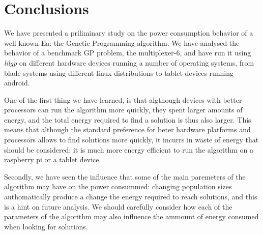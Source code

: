 \section{Conclusions}
\label{conclusions}

We have presented a priliminary study on the power consumption behavior of a well known Ea: the Genetic Programming algorithm.  We have analysed the behavior of a benchmark GP problem, the multiplexer-6, and have run it using \textit{lilgp} on different hardware devices running a number of operating systems, from blade systems using different linux distributions to tablet devices running android.

One of the first thing we have learned, is that algthough devices with better processors can run the algorithm more quickly, they spent larger amounts of energy, and the total energy required to find a solution is thus also larger.  This means that although the standard preference for beter hardware platforms and processors allows to find solutions more quickly, it incurrs in waste of energy that should be considered:  it is much more energy efficient to run the algorithm on a raspberry pi or a tablet device.

Secondly, we have seen the influence that some of the main paremeters of the algorithm may have on the power consummed:  changing population sizes authomatically produce a change the energy required to reach solutions, and this is a hint on future analysis.  We should carefully consider how each of the parameters of the algorithm may also influence the ammount of energy consumed when looking for solutions.